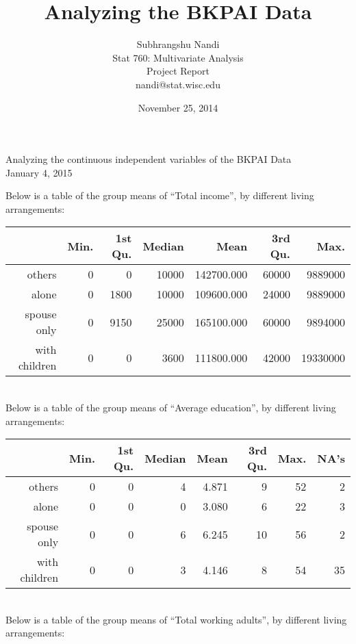 \documentclass[11pt]{article}
\begin{document}



\title{Analyzing the BKPAI Data}
\author{Subhrangshu Nandi\\
  Stat 760: Multivariate Analysis\\
  Project Report \\
  nandi@stat.wisc.edu}
\date{November 25, 2014}


\begin{center}
{\Large{Analyzing the continuous independent variables of the BKPAI Data}}\\
January 4, 2015
\end{center}
Below is a table of the group means of ``Total income'', by different living arrangements:\\
\begin{table}[ht]
\centering
\begin{tabular}{rrrrrrr}
  \hline
 & Min. & 1st Qu. & Median & Mean & 3rd Qu. & Max. \\ 
  \hline
others & 0 & 0 & 10000 & 142700.000 & 60000 & 9889000 \\ 
  alone & 0 & 1800 & 10000 & 109600.000 & 24000 & 9889000 \\ 
  spouse only & 0 & 9150 & 25000 & 165100.000 & 60000 & 9894000 \\ 
  with children & 0 & 0 & 3600 & 111800.000 & 42000 & 19330000 \\ 
   \hline
\end{tabular}
\end{table}\\
Below is a table of the group means of ``Average education'', by different living arrangements:\\
\begin{table}[ht]
\centering
\begin{tabular}{rrrrrrrr}
  \hline
 & Min. & 1st Qu. & Median & Mean & 3rd Qu. & Max. & NA's \\ 
  \hline
others & 0 & 0 & 4 & 4.871 & 9 & 52 & 2 \\ 
  alone & 0 & 0 & 0 & 3.080 & 6 & 22 & 3 \\ 
  spouse only & 0 & 0 & 6 & 6.245 & 10 & 56 & 2 \\ 
  with children & 0 & 0 & 3 & 4.146 & 8 & 54 & 35 \\ 
   \hline
\end{tabular}
\end{table}\\
Below is a table of the group means of ``Total working adults'', by different living arrangements:\\
\end{document}
